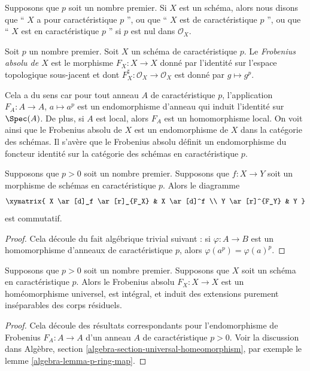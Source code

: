 \noindent
Supposons que $p$ soit un nombre premier. Si $X$ est un schéma, alors nous disons
que `` $X$ a pour caractéristique $p$ '', ou que `` $X$ est de caractéristique $p$
'', ou que `` $X$ est en caractéristique $p$ '' si $p$ est nul dans $\mathcal{O}_X$.

\begin{definition}
\label{definition-absolute-frobenius}
Soit $p$ un nombre premier. Soit $X$ un schéma de caractéristique $p$.
Le {\it Frobenius absolu de $X$} est le morphisme $F_X : X \to X$
donné par l'identité sur l'espace topologique sous-jacent et dont
$F_X^\sharp : \mathcal{O}_X \to \mathcal{O}_X$ est donné par $g \mapsto g^p$.
\end{definition}

\noindent
Cela a du sens car pour tout anneau $A$ de caractéristique $p$,
l'application $F_A : A \to A$, $a \mapsto a^p$ est un
endomorphisme d'anneau qui induit l'identité sur $\Spec(A)$. De
plus, si $A$ est local, alors $F_A$ est un homomorphisme local.
On voit ainsi que le Frobenius absolu de $X$ est
un endomorphisme de $X$ dans la catégorie des schémas. Il s'avère
que le Frobenius absolu définit un endomorphisme du
foncteur identité sur la catégorie des schémas en caractéristique $p$.

\begin{lemma}
\label{lemma-frobenius-endomorphism-identity}
Supposons que $p > 0$ soit un nombre premier.
Supposons que $f : X \to Y$ soit un morphisme de
schémas en caractéristique $p$. Alors le diagramme
$$
\xymatrix{
X \ar[d]_f \ar[r]_{F_X} & X \ar[d]^f \\
Y \ar[r]^{F_Y} & Y
}
$$
est commutatif.
\end{lemma}

\begin{proof}
Cela découle du fait algébrique trivial suivant : si
$\varphi : A \to B$ est un homomorphisme d'anneaux de
caractéristique $p$, alors $\varphi(a^p) = \varphi(a)^p$.
\end{proof}

\begin{lemma}
\label{lemma-frobenius}
Supposons que $p > 0$ soit un nombre premier. Supposons que $X$
soit un schéma en caractéristique $p$. Alors le Frobenius absolu
$F_X : X \to X$ est un homéomorphisme universel, est intégral, et
induit des extensions purement inséparables des corps résiduels.
\end{lemma}

\begin{proof}
Cela découle des résultats correspondants pour l'endomorphisme de
Frobenius $F_A : A \to A$ d'un anneau $A$ de caractéristique $p > 0$.
Voir la discussion dans Algèbre, section
\ref{algebra-section-universal-homeomorphism}, par exemple le lemme \ref{algebra-lemma-p-ring-map}.
\end{proof}


